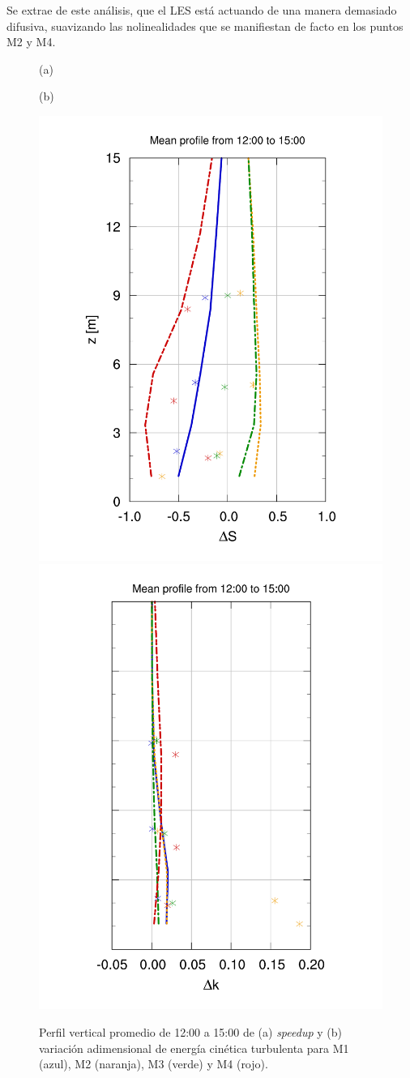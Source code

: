 Se extrae de este análisis, que el LES está actuando de una manera demasiado difusiva, suavizando las nolinealidades que se manifiestan de facto en los puntos M2 y M4.
\begin{figure}[H]
	\begin{minipage}{0.5\linewidth}
		\centering
		\hspace{7mm}(a)\end{minipage}%
	\begin{minipage}{0.5\linewidth}
		\centering
		\hspace{-5mm}(b)\end{minipage}%
	
	\centering
	\includegraphics[height=0.75\linewidth,page=1,trim={28mm 10mm 25mm 23mm},clip]{Imagenes/06/bol/V_masts}%
	\includegraphics[height=0.75\linewidth,page=1,trim={30mm 10mm 17mm 20mm},clip]{Imagenes/06/bol/k_masts}%
	\vspace{-2mm}\caption{Perfil vertical promedio de 12:00 a 15:00 de (a) \emph{speedup} y (b) variación adimensional de energía cinética turbulenta para M1 (azul), M2 (naranja), M3 (verde) y M4 (rojo).}
	\label{fig:06_bol_mast_tke_speedup}
\end{figure}

